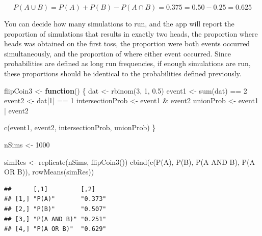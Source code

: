 \documentclass[
]{book}
\newenvironment{Shaded}{\begin{snugshade}}{\end{snugshade}}
\newcommand{\ControlFlowTok}[1]{\textcolor[rgb]{0.13,0.29,0.53}{\textbf{#1}}}
\newcommand{\DecValTok}[1]{\textcolor[rgb]{0.00,0.00,0.81}{#1}}
\newcommand{\FloatTok}[1]{\textcolor[rgb]{0.00,0.00,0.81}{#1}}
\newcommand{\FunctionTok}[1]{\textcolor[rgb]{0.00,0.00,0.00}{#1}}
\newcommand{\NormalTok}[1]{#1}
\newcommand{\OtherTok}[1]{\textcolor[rgb]{0.56,0.35,0.01}{#1}}
\newcommand{\SpecialCharTok}[1]{\textcolor[rgb]{0.00,0.00,0.00}{#1}}
\newcommand{\StringTok}[1]{\textcolor[rgb]{0.31,0.60,0.02}{#1}}
\theoremstyle{definition}
\theoremstyle{definition}
\theoremstyle{definition}
\theoremstyle{remark}
\begin{document}
\[P(A \cup B) = P(A) + P(B) - P(A \cap B) = 0.375 = 0.50 - 0.25 = 0.625\]

You can decide how many simulations to run, and the app will report the proportion of simulations that results in exactly two heads, the proportion where heads was obtained on the first toss, the proportion were both events occurred simultaneously, and the proportion of where either event occurred. Since probabilities are defined as long run frequencies, if enough simulations are run, these proportions should be identical to the probabilities defined previously.

\begin{Shaded}
\begin{Highlighting}[]
\NormalTok{flipCoin3 }\OtherTok{\textless{}{-}} \ControlFlowTok{function}\NormalTok{() \{}
\NormalTok{    dat }\OtherTok{\textless{}{-}} \FunctionTok{rbinom}\NormalTok{(}\DecValTok{3}\NormalTok{, }\DecValTok{1}\NormalTok{, }\FloatTok{0.5}\NormalTok{)}
\NormalTok{    event1 }\OtherTok{\textless{}{-}} \FunctionTok{sum}\NormalTok{(dat) }\SpecialCharTok{==} \DecValTok{2}
\NormalTok{    event2 }\OtherTok{\textless{}{-}}\NormalTok{ dat[}\DecValTok{1}\NormalTok{] }\SpecialCharTok{==} \DecValTok{1}
\NormalTok{    intersectionProb }\OtherTok{\textless{}{-}}\NormalTok{ event1 }\SpecialCharTok{\&}\NormalTok{ event2}
\NormalTok{    unionProb }\OtherTok{\textless{}{-}}\NormalTok{ event1 }\SpecialCharTok{|}\NormalTok{ event2}
    
   \FunctionTok{c}\NormalTok{(event1, event2, intersectionProb, unionProb)}
\NormalTok{\}}

\NormalTok{nSims }\OtherTok{\textless{}{-}} \DecValTok{1000}

\NormalTok{simRes }\OtherTok{\textless{}{-}} \FunctionTok{replicate}\NormalTok{(nSims, }\FunctionTok{flipCoin3}\NormalTok{())}
\FunctionTok{cbind}\NormalTok{(}\FunctionTok{c}\NormalTok{(}\StringTok{\textquotesingle{}P(A)\textquotesingle{}}\NormalTok{, }\StringTok{\textquotesingle{}P(B)\textquotesingle{}}\NormalTok{, }\StringTok{\textquotesingle{}P(A AND B)\textquotesingle{}}\NormalTok{, }\StringTok{\textquotesingle{}P(A OR B)\textquotesingle{}}\NormalTok{), }\FunctionTok{rowMeans}\NormalTok{(simRes))}
\end{Highlighting}
\end{Shaded}

\begin{verbatim}
##      [,1]         [,2]   
## [1,] "P(A)"       "0.373"
## [2,] "P(B)"       "0.507"
## [3,] "P(A AND B)" "0.251"
## [4,] "P(A OR B)"  "0.629"
\end{verbatim}
\end{document}
